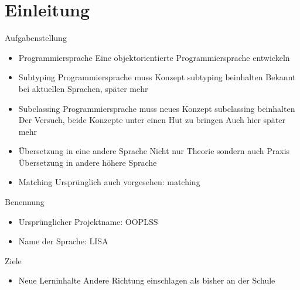 \section{Einleitung}

\begin{frame}[t]{Aufgabenstellung}
	\begin{itemize}[<+->]
		\item Programmiersprache
		 {Eine objektorientierte Programmiersprache entwickeln}

		\item Subtyping
		 {Programmiersprache muss Konzept subtyping beinhalten}
		 {Bekannt bei aktuellen Sprachen, später mehr}

		\item Subclassing
		 {Programmiersprache muss neues Konzept subclassing beinhalten}
		 {Der Versuch, beide Konzepte unter einen Hut zu bringen}
		 {Auch hier später mehr}

		\item Übersetzung in eine andere Sprache
		 {Nicht nur Theorie sondern auch Praxis}
		 {Übersetzung in andere höhere Sprache}

		\item Matching
		 {Ursprünglich auch vorgesehen: matching}

	\end{itemize}

\end{frame}

\begin{frame}[t]{Benennung}
	\begin{itemize}[<+->]

		\item Ursprünglicher Projektname: OOPLSS

		\item Name der Sprache: LISA 

	\end{itemize}


\end{frame}

\begin{frame}[t]{Ziele}

	\begin{itemize}[<+->]
		\item Neue Lerninhalte
		 {Andere Richtung einschlagen als bisher an der Schule}
	\end{itemize}

\end{frame}
